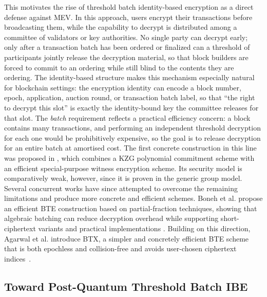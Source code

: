This motivates the rise of threshold batch identity-based encryption as a direct defense against MEV. In this approach, users encrypt their transactions before broadcasting them, while the capability to decrypt is distributed among a committee of validators or key authorities. No single party can decrypt early; only after a transaction batch has been ordered or finalized can a threshold of participants jointly release the decryption material, so that block builders are forced to commit to an ordering while still blind to the contents they are ordering. The identity-based structure makes this mechanism especially natural for blockchain settings: the encryption identity can encode a block number, epoch, application, auction round, or transaction batch label, so that ``the right to decrypt this slot'' is exactly the identity-bound key the committee releases for that slot. The \emph{batch} requirement reflects a practical efficiency concern: a block contains many transactions, and performing an independent threshold decryption for each one would be prohibitively expensive, so the goal is to release decryption for an entire batch at amortised cost. The first concrete construction in this line was proposed in \cite{EPRINT:BonLauTas25}, which combines a KZG polynomial commitment scheme with an efficient special-purpose witness encryption scheme. Its security model is comparatively weak, however, since it is proven in the generic group model. Several concurrent works have since attempted to overcome the remaining limitations and produce more concrete and efficient schemes. Boneh et al. propose an efficient BTE construction based on partial-fraction techniques, showing that algebraic batching can reduce decryption overhead while supporting short-ciphertext variants and practical implementations \cite{EPRINT:BNRT26}. Building on this direction, Agarwal et al. introduce BTX, a simpler and concretely efficient BTE scheme that is both epochless and collision-free and avoids user-chosen ciphertext indices~\cite{EPRINT:ADGRS26}.


\subsection{Toward Post-Quantum Threshold Batch IBE}
\label{subsec:pq-tbibe}

